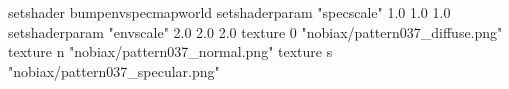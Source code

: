 setshader bumpenvspecmapworld
setshaderparam "specscale" 1.0 1.0 1.0
setshaderparam "envscale"  2.0 2.0 2.0
   texture 0 "nobiax/pattern037_diffuse.png"
   texture n "nobiax/pattern037_normal.png"
   texture s "nobiax/pattern037_specular.png"